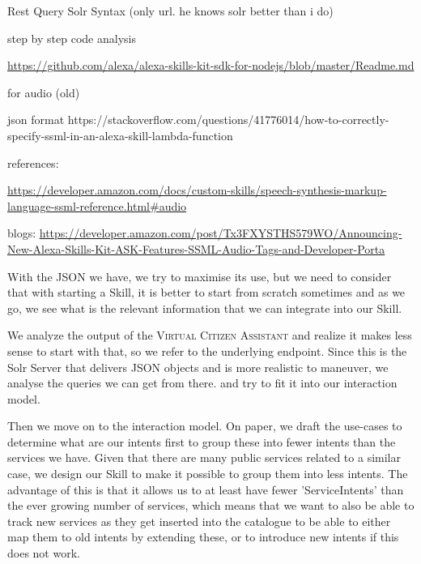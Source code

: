 Rest Query
Solr Syntax (only url. he knows solr better than i do)








step by step code analysis

\url{https://github.com/alexa/alexa-skills-kit-sdk-for-nodejs/blob/master/Readme.md}





for audio (old)

json format https://stackoverflow.com/questions/41776014/how-to-correctly-specify-ssml-in-an-alexa-skill-lambda-function





references:

\url{https://developer.amazon.com/docs/custom-skills/speech-synthesis-markup-language-ssml-reference.html#audio}



blogs:
\url{https://developer.amazon.com/post/Tx3FXYSTHS579WO/Announcing-New-Alexa-Skills-Kit-ASK-Features-SSML-Audio-Tags-and-Developer-Porta}

With the JSON we have, we try to maximise its use, but we need to consider that with starting a Skill, it is better to start from scratch sometimes and as we go, we see what is the relevant information that we can integrate into our Skill.

We analyze the output of the \textsc{Virtual Citizen Assistant } and realize it makes less sense to start with that, so we refer to the underlying endpoint. Since this is the Solr Server that delivers JSON objects and is more realistic to maneuver, we analyse the queries we can get from there. and try to fit it into our interaction model.

Then we move on to the interaction model. On paper, we draft the use-cases to determine what are our intents first to group these into fewer intents than the services we have. Given that there are many public services related to a similar case, we design our Skill to make it possible to group them into less intents. The advantage of this is that it allows us to at least have fewer 'ServiceIntents' than the ever growing number of services, which means that we want to also be able to track new services as they get inserted into the catalogue to be able to either map them to old intents by extending these, or to introduce new intents if this does not work.



